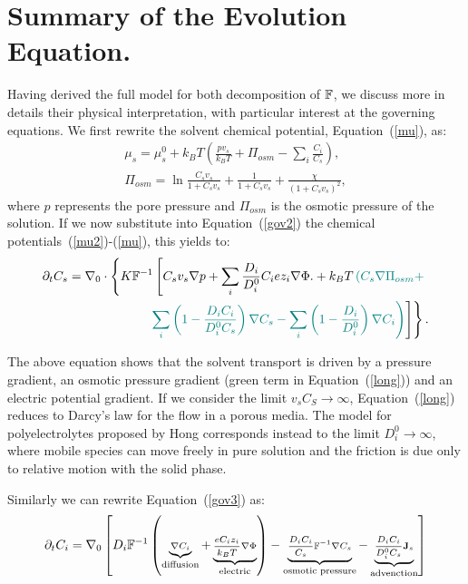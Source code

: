 \section{Summary of the Evolution Equation.}

Having derived the full model for both decomposition of $\mathbb{F}$, we discuss more in details their physical interpretation, with particular interest at the governing equations. We first rewrite the solvent chemical potential, Equation~(\ref{mu}), as:
\begin{gather}
\mu_s = \mu^0_s + k_B T \left(\frac{p v_s}{k_BT} +\Pi_{osm}-\sum_i \frac{C_i}{C_s}\right)\label{mu2},\\
\Pi_{osm}=\ln \frac{C_s v_s}{1+C_s v_s} + \frac{1}{1+C_sv_s}+\frac{\chi}{(1+C_s v_s)^2},
\end{gather}
where $p$ represents the pore pressure and $\Pi_{osm}$ is the osmotic pressure of the solution. If we now substitute into Equation~(\ref{gov2}) the chemical potentials~(\ref{mu2})-(\ref{mu}), this yields to:
\begin{equation}
\begin{aligned}
\partial_t C_s=\nabla_0 \cdot\left\{K\mathbb{F}^{-1}\left[C_s v_s\nabla p +\sum_i \frac{D_i}{D^0_i} C_i e z_i \nabla \Phi.+ k_B T\color{teal} \left(C_s \nabla \Pi_{osm}+  \right.\right.\right.\\
\left.\left.\left.\color{teal} \sum_i\left(1-\frac{D_iC_i}{D^0_iC_s}\right) \nabla C_s- \sum_i\left(1-\frac{D_i}{D^0_i}\right) \nabla C_i \right)\color{black}\right]\right\}.\label{long}
\end{aligned}
\end{equation}

The above equation shows that the solvent transport is driven by a pressure gradient, an osmotic pressure gradient (green term in Equation~(\ref{long})) and an electric potential gradient. If we consider the limit $v_sC_S\rightarrow\infty$, Equation~(\ref{long}) reduces to Darcy's law for the flow in a porous media. The model for polyelectrolytes proposed by Hong \cite{Reviewpolyel} corresponds instead to the limit $D^0_i\rightarrow\infty$, where mobile species can move freely in pure solution and the friction is due only to relative motion with the solid phase.

Similarly we can rewrite Equation~(\ref{gov3}) as:
\begin{equation}
\scriptsize
\partial_t C_i = \nabla_0 \left[D_i\mathbb{F}^{-1}\left(\underbrace{\nabla C_i}_{\text{diffusion}} +\underbrace{\frac{eC_iz_i}{k_B T} \nabla \Phi}_{\text{electric}}\right)-\underbrace{\frac{D_i C_i}{C_s}\mathbb{F}^{-1}\nabla C_s}_{\text{osmotic pressure}}-\underbrace{\frac{D_i C_i}{D^0_iC_s}\mathbf{J}_s}_{\text{advenction}}\right]\label{long2}
\end{equation}

